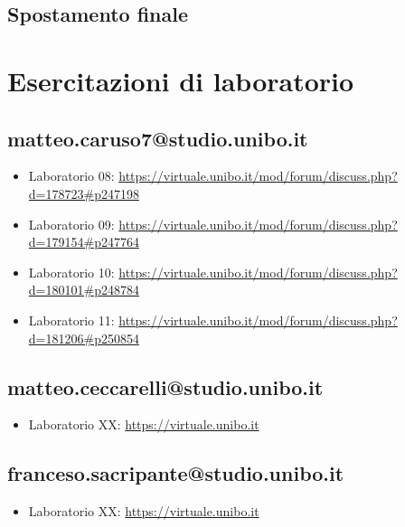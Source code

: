 \documentclass[a4paper,12pt]{report}
\begin{document}
\section{Spostamento finale}

\appendix
\chapter{Esercitazioni di laboratorio}

\section{matteo.caruso7@studio.unibo.it}

\begin{itemize}
	\item Laboratorio 08: \url{https://virtuale.unibo.it/mod/forum/discuss.php?d=178723#p247198}
	\item Laboratorio 09: \url{https://virtuale.unibo.it/mod/forum/discuss.php?d=179154#p247764}
	\item Laboratorio 10: \url{https://virtuale.unibo.it/mod/forum/discuss.php?d=180101#p248784}
	\item Laboratorio 11: \url{https://virtuale.unibo.it/mod/forum/discuss.php?d=181206#p250854}
\end{itemize}

\section{matteo.ceccarelli@studio.unibo.it}
\begin{itemize}
	\item Laboratorio XX: \url{https://virtuale.unibo.it}
\end{itemize}

\section{franceso.sacripante@studio.unibo.it}
\begin{itemize}
	\item Laboratorio XX: \url{https://virtuale.unibo.it}
\end{itemize}




\end{document}
